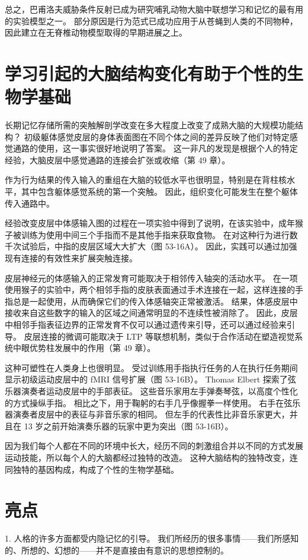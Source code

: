 总之，巴甫洛夫威胁条件反射已成为研究哺乳动物大脑中联想学习和记忆的最有用的实验模型之一。 部分原因是行为范式已成功应用于从苍蝇到人类的不同物种，因此建立在无脊椎动物模型取得的早期进展之上。


\section{学习引起的大脑结构变化有助于个性的生物学基础}
长期记忆存储所需的突触解剖学改变在多大程度上改变了成熟大脑的大规模功能结构？ 初级躯体感觉皮层的身体表面图在不同个体之间的差异反映了他们对特定感觉通路的使用，这一事实很好地说明了答案。 这一非凡的发现是根据个人的特定经验，大脑皮层中感觉通路的连接会扩张或收缩（第 49 章）。

作为行为结果的传入输入的重组在大脑的较低水平也很明显，特别是在背柱核水平，其中包含躯体感觉系统的第一个突触。 因此，组织变化可能发生在整个躯体传入通路中。

经验改变皮层中体感输入图的过程在一项实验中得到了说明，在该实验中，成年猴子被训练为使用中间三个手指而不是其他手指来获取食物。 在对这种行为进行数千次试验后，中指的皮层区域大大扩大（图 53-16A）。 因此，实践可以通过加强现有连接的有效性来扩展突触连接。

皮层神经元的体感输入的正常发育可能取决于相邻传入轴突的活动水平。 在一项使用猴子的实验中，两个相邻手指的皮肤表面通过手术连接在一起，这样连接的手指总是一起使用，从而确保它们的传入体感轴突正常被激活。 结果，体感皮层中接收来自这些数字的输入的区域之间通常明显的不连续性被消除了。 因此，皮层中相邻手指表征边界的正常发育不仅可以通过遗传来引导，还可以通过经验来引导。 皮层连接的微调可能取决于 LTP 等联想机制，类似于合作活动在塑造视觉系统中眼优势柱发展中的作用（第 49 章）。

这种可塑性在人类身上也很明显。 受过训练用手指执行任务的人在执行任务期间显示初级运动皮层中的 fMRI 信号扩展（图 53-16B）。 Thomas Elbert 探索了弦乐器演奏者运动皮层中的手部表征。 这些音乐家用左手弹奏琴弦，以高度个性化的方式操纵手指。 相比之下，用于鞠躬的右手几乎像握拳一样使用。 右手在弦乐器演奏者皮层中的表征与非音乐家的相同。 但左手的代表性比非音乐家更大，并且在 13 岁之前开始演奏乐器的玩家中更为突出（图 53-16B）。

因为我们每个人都在不同的环境中长大，经历不同的刺激组合并以不同的方式发展运动技能，所以每个人的大脑都经过独特的改造。 这种大脑结构的独特改变，连同独特的基因构成，构成了个性的生物学基础。


\section{亮点}
1. 人格的许多方面都受内隐记忆的引导。 我们所经历的很多事情——我们所感知的、所想的、幻想的——并不是直接由有意识的思想控制的。 

